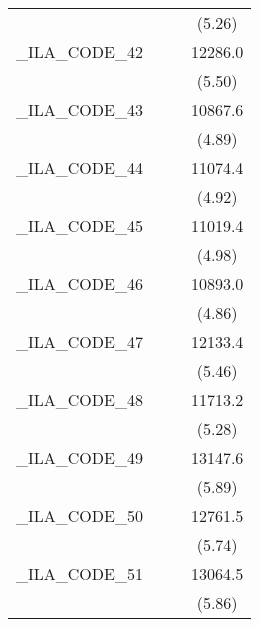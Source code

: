 {\begin{tabular}{l*{3}{c}}
            &                     &                     &      (5.26)         \\
[1em]
\_ILA\_CODE\_42&                     &                     &     12286.0\sym{***}\\
            &                     &                     &      (5.50)         \\
[1em]
\_ILA\_CODE\_43&                     &                     &     10867.6\sym{***}\\
            &                     &                     &      (4.89)         \\
[1em]
\_ILA\_CODE\_44&                     &                     &     11074.4\sym{***}\\
            &                     &                     &      (4.92)         \\
[1em]
\_ILA\_CODE\_45&                     &                     &     11019.4\sym{***}\\
            &                     &                     &      (4.98)         \\
[1em]
\_ILA\_CODE\_46&                     &                     &     10893.0\sym{***}\\
            &                     &                     &      (4.86)         \\
[1em]
\_ILA\_CODE\_47&                     &                     &     12133.4\sym{***}\\
            &                     &                     &      (5.46)         \\
[1em]
\_ILA\_CODE\_48&                     &                     &     11713.2\sym{***}\\
            &                     &                     &      (5.28)         \\
[1em]
\_ILA\_CODE\_49&                     &                     &     13147.6\sym{***}\\
            &                     &                     &      (5.89)         \\
[1em]
\_ILA\_CODE\_50&                     &                     &     12761.5\sym{***}\\
            &                     &                     &      (5.74)         \\
[1em]
\_ILA\_CODE\_51&                     &                     &     13064.5\sym{***}\\
            &                     &                     &      (5.86)         \\

\end{tabular}}
